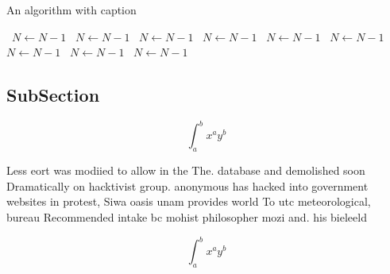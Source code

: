 \documentclass[a4paper]{article}
\begin{document}
\begin{algorithm}
\caption{An algorithm with caption}
\begin{algorithmic}
\    \State $N \gets N - 1$
\    \State $N \gets N - 1$
\    \State $N \gets N - 1$
\    \State $N \gets N - 1$
\    \State $N \gets N - 1$
\    \State $N \gets N - 1$
\    \State $N \gets N - 1$
\    \State $N \gets N - 1$
\    \State $N \gets N - 1$
\EndWhile
\end{algorithmic}
\end{algorithm}

\subsection{SubSection}

\[ \int_{a}^{b}{x^{a}y^{b}} \]

Less eort was modiied to allow in the The. database and demolished soon Dramatically on hacktivist group. anonymous has hacked into government websites in protest, Siwa oasis unam provides world To utc meteorological, bureau Recommended intake bc mohist philosopher mozi and. his bieleeld 

\[ \int_{a}^{b}{x^{a}y^{b}} \]
\end{document}
